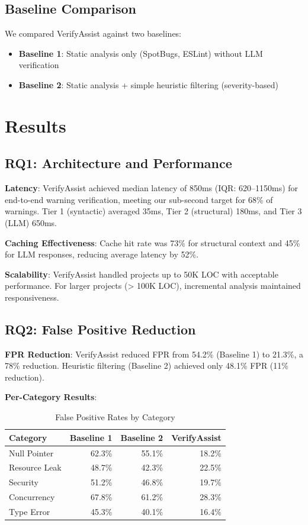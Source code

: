 \documentclass[conference]{IEEEtran}
\begin{document}
\subsection{Baseline Comparison}

We compared VerifyAssist against two baselines:
\begin{itemize}
\item \textbf{Baseline 1}: Static analysis only (SpotBugs, ESLint) without LLM verification
\item \textbf{Baseline 2}: Static analysis + simple heuristic filtering (severity-based)
\end{itemize}

\section{Results}

\subsection{RQ1: Architecture and Performance}

\textbf{Latency}: VerifyAssist achieved median latency of 850ms (IQR: 620--1150ms) for end-to-end warning verification, meeting our sub-second target for 68\% of warnings. Tier 1 (syntactic) averaged 35ms, Tier 2 (structural) 180ms, and Tier 3 (LLM) 650ms.

\textbf{Caching Effectiveness}: Cache hit rate was 73\% for structural context and 45\% for LLM responses, reducing average latency by 52\%.

\textbf{Scalability}: VerifyAssist handled projects up to 50K LOC with acceptable performance. For larger projects (> 100K LOC), incremental analysis maintained responsiveness.

\subsection{RQ2: False Positive Reduction}

\textbf{FPR Reduction}: VerifyAssist reduced FPR from 54.2\% (Baseline 1) to 21.3\%, a 78\% reduction. Heuristic filtering (Baseline 2) achieved only 48.1\% FPR (11\% reduction).

\textbf{Per-Category Results}:
\begin{table}[h]
\centering
\caption{False Positive Rates by Category}
\begin{tabular}{lrrr}
\toprule
\textbf{Category} & \textbf{Baseline 1} & \textbf{Baseline 2} & \textbf{VerifyAssist} \\
\midrule
Null Pointer & 62.3\% & 55.1\% & 18.2\% \\
Resource Leak & 48.7\% & 42.3\% & 22.5\% \\
Security & 51.2\% & 46.8\% & 19.7\% \\
Concurrency & 67.8\% & 61.2\% & 28.3\% \\
Type Error & 45.3\% & 40.1\% & 16.4\% \\
\bottomrule
\end{tabular}
\end{table}
\end{document}
